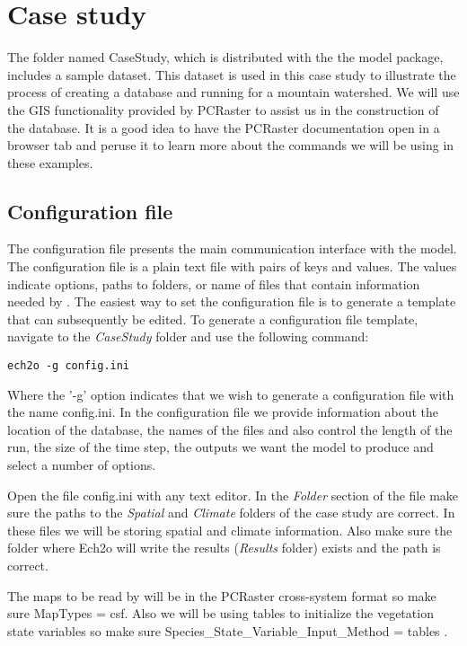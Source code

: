\chapter{Case study}



The folder named \textsf{CaseStudy}, which is distributed with the the \echo model package, includes a sample dataset. This dataset is used in this case study to illustrate the process of creating a database and running \echo for a mountain watershed. We will use the GIS functionality provided by PCRaster to assist us in the construction of the database. It is a good idea to have the PCRaster documentation open in a browser tab and peruse it to learn more about the commands we will be using in these examples.

\section{Configuration file} 

The configuration file presents the main communication interface with the model. The configuration file is a plain text file with pairs of keys and values. The values indicate options, paths to folders, or name of files that contain information needed by \echo.   The easiest way to set the configuration file is to generate a template that can subsequently be edited. To generate a configuration file template, navigate to the \textit{CaseStudy} folder and use the following command:

\begin{verbatim}
ech2o -g config.ini
\end{verbatim}


Where the '\textsf{-g}' option indicates that we wish to generate a configuration file with the name \textsf{config.ini}.  In the configuration file we provide information about the location of the database, the names of the files and also control the length of the run, the size of the time step, the outputs we want the model to produce and select a number of options.  

Open the file \textsf{config.ini} with any text editor. In the \textit{Folder} section of the file make sure the paths to the \textit{Spatial} and \textit{Climate} folders of the case study are correct. In these files we will be storing spatial and climate information. Also make sure the folder where Ech2o will write the results (\textit{Results} folder) exists and the path is correct.

The maps to be read by \echo will be in the PCRaster cross-system format so make sure \textsf{MapTypes = csf}. Also we will be using tables to initialize the vegetation state variables so make sure \textsf{Species\_State\_Variable\_Input\_Method = tables} . 


